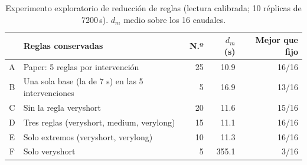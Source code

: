 \begin{table}[!t]
\caption{Experimento exploratorio de reducción de reglas (lectura calibrada; 10 réplicas de 7200\,s). $d_m$ medio sobre los 16 caudales.}
\label{tab:ablacion}
\centering
\scriptsize
\setlength{\tabcolsep}{2.4pt}
\begin{tabular}{@{}cp{}rrr@{}}
\toprule
 & Reglas conservadas & N.º & $d_m$ (s) & Mejor que fijo \\
\midrule
A & Paper: 5 reglas por intervención & 25 & 10.9 & 16/16 \\
B & Una sola base (la de 7 s) en las 5 intervenciones & 5 & 16.9 & 13/16 \\
C & Sin la regla veryshort & 20 & 11.6 & 15/16 \\
D & Tres reglas (veryshort, medium, verylong) & 15 & 11.1 & 16/16 \\
E & Solo extremos (veryshort, verylong) & 10 & 11.3 & 16/16 \\
F & Solo veryshort & 5 & 355.1 & 3/16 \\
\bottomrule
\end{tabular}
\end{table}
